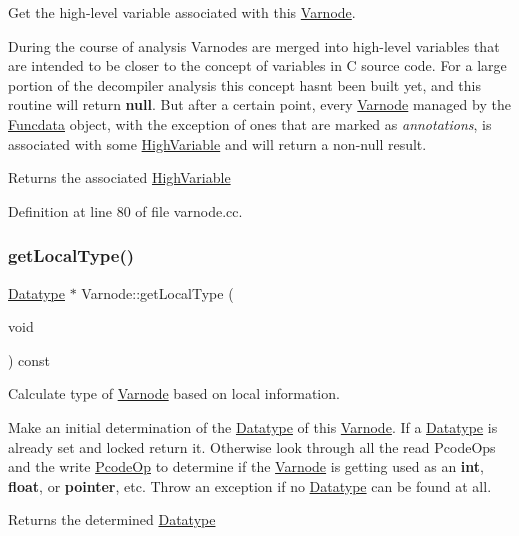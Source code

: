 Get the high-\/level variable associated with this \mbox{\hyperlink{class_varnode}{Varnode}}. 

During the course of analysis Varnodes are merged into high-\/level variables that are intended to be closer to the concept of variables in C source code. For a large portion of the decompiler analysis this concept hasn\textquotesingle{}t been built yet, and this routine will return {\bfseries{null}}. But after a certain point, every \mbox{\hyperlink{class_varnode}{Varnode}} managed by the \mbox{\hyperlink{class_funcdata}{Funcdata}} object, with the exception of ones that are marked as {\itshape annotations}, is associated with some \mbox{\hyperlink{class_high_variable}{High\+Variable}} and will return a non-\/null result. \begin{DoxyReturn}{Returns}
the associated \mbox{\hyperlink{class_high_variable}{High\+Variable}} 
\end{DoxyReturn}


Definition at line 80 of file varnode.\+cc.

\mbox{\label{class_varnode_ae02e0cb9be55fc557361b707068599c5}} 
\subsubsection{\texorpdfstring{getLocalType()}{getLocalType()}}
{\footnotesize\ttfamily \mbox{\hyperlink{class_datatype}{Datatype}} $\ast$ Varnode\+::get\+Local\+Type (\begin{DoxyParamCaption}\item[{void}]{ }\end{DoxyParamCaption}) const}



Calculate type of \mbox{\hyperlink{class_varnode}{Varnode}} based on local information. 

Make an initial determination of the \mbox{\hyperlink{class_datatype}{Datatype}} of this \mbox{\hyperlink{class_varnode}{Varnode}}. If a \mbox{\hyperlink{class_datatype}{Datatype}} is already set and locked return it. Otherwise look through all the read Pcode\+Ops and the write \mbox{\hyperlink{class_pcode_op}{Pcode\+Op}} to determine if the \mbox{\hyperlink{class_varnode}{Varnode}} is getting used as an {\bfseries{int}}, {\bfseries{float}}, or {\bfseries{pointer}}, etc. Throw an exception if no \mbox{\hyperlink{class_datatype}{Datatype}} can be found at all. \begin{DoxyReturn}{Returns}
the determined \mbox{\hyperlink{class_datatype}{Datatype}} 
\end{DoxyReturn}


